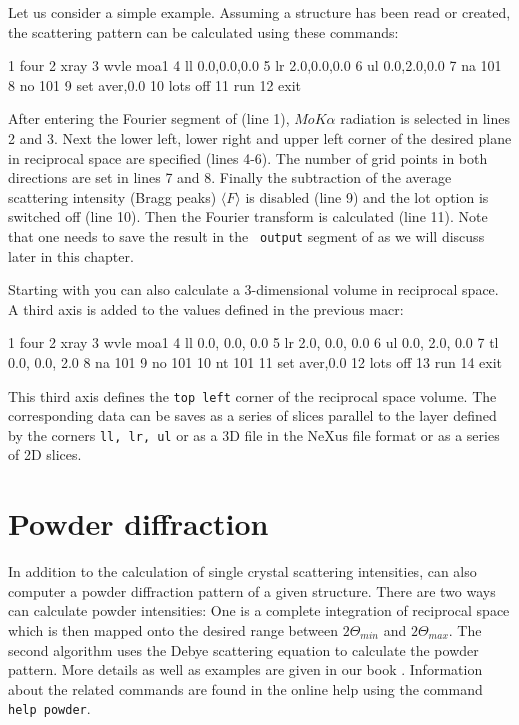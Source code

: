 Let us consider a simple example. Assuming a structure has been read
or created, the scattering pattern can be calculated using these
commands:

\begin{MacVerbatim}
     1  four
     2    xray
     3    wvle moa1
     4    ll 0.0,0.0,0.0
     5    lr 2.0,0.0,0.0
     6    ul 0.0,2.0,0.0
     7    na 101
     8    no 101
     9    set aver,0.0
    10    lots off
    11    run
    12  exit
\end{MacVerbatim}

After entering the Fourier segment of {\Discus} (line 1),
$MoK\alpha$ radiation is selected in lines 2 and 3. Next the lower
left, lower right and upper left corner of the desired plane in
reciprocal space are specified (lines 4-6). The number of grid
points in both directions are set in lines 7 and 8. Finally the
subtraction of the average scattering intensity (Bragg peaks)
$\langle F \rangle$ is disabled (line 9) and the lot option is
switched off (line 10). Then the Fourier transform is calculated
(line 11). Note that one needs to save the result in the {\tt
output} segment of {\Discus} as we will discuss later in this
chapter.
\par
Starting with  you can also calculate a 3-dimensional 
volume in reciprocal space. A third axis is added to the 
values defined in the previous macr:

\begin{MacVerbatim}
     1  four
     2    xray
     3    wvle moa1
     4    ll 0.0, 0.0, 0.0
     5    lr 2.0, 0.0, 0.0
     6    ul 0.0, 2.0, 0.0
     7    tl 0.0, 0.0, 2.0
     8    na 101
     9    no 101
    10    nt 101
    11    set aver,0.0
    12    lots off
    13    run
    14  exit
\end{MacVerbatim}

This third axis defines the {\tt top left} corner of the reciprocal
space volume. The corresponding data can be saves as a series of slices
parallel to the layer defined by the corners {\tt ll, lr, ul} or as a
3D file in the NeXus file format or as a series of 2D slices.
\par

\section{Powder diffraction \label{four-powder}}

In addition to the calculation of single crystal scattering
intensities, {\Discus} can also computer a powder diffraction
pattern of a given structure. There are two ways {\Discus} can
calculate powder intensities: One is a complete integration of
reciprocal space which is then mapped onto the desired range between
$2\Theta_{min}$ and $2\Theta_{max}$. The second algorithm uses the
Debye scattering equation to calculate the powder pattern. More details as well
as examples are given in our book \citep{nedpro}. Information about
the related commands are found in the online help using the command
{\tt help powder}.
\par


